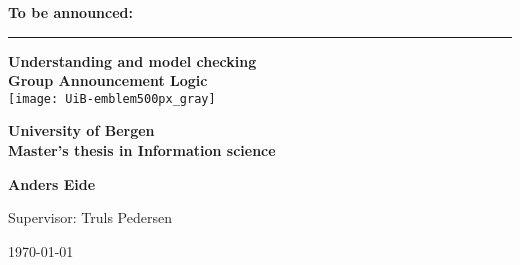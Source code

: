 %
%




\begin{titlepage}
\begin{center}

\Huge \textbf{To be announced:}


\rule {8cm}{1pt} \break
\LARGE \textbf{{Understanding and model checking \\ 
Group Announcement Logic}} \\

\vspace{3cm}
\texttt{[image: UiB-emblem500px\_gray]}
\vfill

\textbf{
{\Large University of Bergen} \\
{\large Master's thesis in Information science}\\
}
\vspace{10mm}

\textbf{
\LARGE Anders Eide \\
}

{\Large Supervisor: Truls Pedersen}\\



\vspace{10mm}



{\large \today}

\end{center}
\end{titlepage}

\restoregeometry

\blankpage %